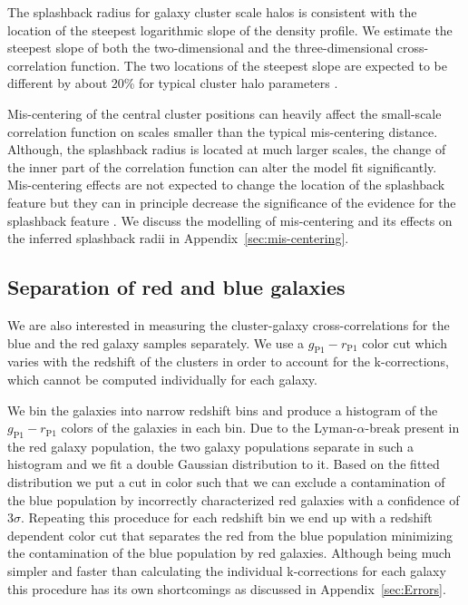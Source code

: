 \documentclass[iop, apjl, twocolappendix, numberedappendix]{emulateapj}
\begin{document}
The splashback radius for galaxy cluster scale halos is consistent
with the location of the steepest logarithmic slope of the density
profile. We estimate the steepest slope of both the two-dimensional
and the three-dimensional cross-correlation function. The two
locations of the steepest slope are expected to be different by
about 20\% for typical cluster halo parameters
\citep{diemer2014dependence, more2016detection}.

Mis-centering of the central cluster positions can heavily affect 
the small-scale correlation function on scales smaller than the typical mis-centering distance. 
Although, the splashback radius is located at much larger scales, 
the change of the inner part of the correlation function can alter the model fit significantly. 
Mis-centering effects are not expected to change the location of the splashback feature 
but they can in principle decrease the significance of the evidence for the splashback feature \citep{baxter2017halo}.
We discuss the modelling of mis-centering and its effects on the inferred splashback radii in Appendix~\ref{sec:mis-centering}.
\subsection{Separation of red and blue galaxies}
\label{sec:Color}

We are also interested in measuring the cluster-galaxy
cross-correlations for the blue and the red galaxy samples
separately. We use a $g_{\mathrm{P1}}-r_{\mathrm{P1}}$ color cut
which varies with the redshift of the clusters in order to account
for the k-corrections, which cannot be computed individually for
each galaxy.

We bin the galaxies into narrow redshift bins and produce a histogram of
the $g_{\mathrm{P1}}-r_{\mathrm{P1}}$ colors of the galaxies in each bin. Due to
the Lyman-$\alpha$-break present in the red galaxy population, the two galaxy populations
separate in such a histogram and we fit a double Gaussian distribution to it.
Based on the fitted distribution we put a cut in color such that we can exclude a contamination
of the blue population by incorrectly characterized red galaxies with a confidence of 3$\sigma$.
Repeating this proceduce for each redshift bin we end up with a redshift dependent color cut that
separates the red from the blue population minimizing the contamination of the blue population by
red galaxies. Although being much simpler and faster than calculating the individual k-corrections
for each galaxy this procedure has its own shortcomings as discussed in Appendix~\ref{sec:Errors}.
\end{document}

